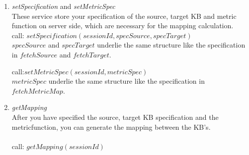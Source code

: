 \documentclass{article}
\begin{document}
\begin{enumerate}
 
\item \textit{setSpecification} and \textit{setMetricSpec}
\\
These service store your specification of the source, target KB and metric function on server side, which are necessary for the mapping calculation.\\

 call: $setSpecification(sessionId, specSource, specTarget)$\\
 $specSource$ and $specTarget$ underlie the same structure like the specification in $fetchSource$ and $fetchTarget$.
 
 call:$setMetricSpec(sessionId,metricSpec)$\\
 $metricSpec$ underlie the same structure like the specification in 
 $fetchMetricMap$.
 
 \item \textit{getMapping}
 \\
 After you have specified the source, target KB specification and the metricfunction, you can generate the mapping between the KB's.\\
 \\
 call: $getMapping(sessionId)$
\end{enumerate}

\newpage
\end{document}
